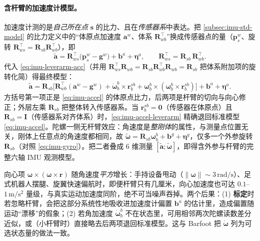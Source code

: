 \paragraph{含杆臂的加速度计模型。}
加速度计测的是\emph{自己所在点} $\mathbf s$ 的比力、且在\emph{传感器系}中表达。把 \cref{subsec:imu-std-model} 的比力定义中的“体原点加速度 $\mathbf a^w$、体系 $\mathbf R_{wb}^\top$”换成传感器点的量（$\ddot{\mathbf p}_s^w$、旋转 $\mathbf R_{ws}^\top=\mathbf R_{sb}\mathbf R_{wb}^\top$），即
\begin{equation}
  \tilde{\mathbf a}=\mathbf R_{ws}^\top\big(\ddot{\mathbf p}_s^w-\mathbf g^w\big)+\mathbf b^a+\boldsymbol\eta^a,
  \qquad \mathbf R_{ws}^\top=\mathbf R_{sb}\,\mathbf R_{wb}^\top.
  \label{eq:imu-accel-leverarm-raw}
\end{equation}
代入 \cref{eq:imu-leverarm-acc}（并用 $\mathbf R_{ws}^\top\mathbf R_{wb}=\mathbf R_{sb}\mathbf R_{wb}^\top\mathbf R_{wb}=\mathbf R_{sb}$ 把体系附加项的旋转化简）得最终模型：
\begin{equation}
  \tilde{\mathbf a}=\mathbf R_{sb}\Big[\mathbf R_{wb}^\top(\mathbf a^w-\mathbf g^w)
  +\dot{\boldsymbol\omega}_b^b\times\mathbf r_b^{sb}
  +\boldsymbol\omega_b^b\times(\boldsymbol\omega_b^b\times\mathbf r_b^{sb})\Big]+\mathbf b^a+\boldsymbol\eta^a.
  \label{eq:imu-accel-leverarm}
\end{equation}
方括号第一项正是 \cref{eq:imu-accel} 的体原点比力，后两项是杆臂的切向与向心修正；外层左乘 $\mathbf R_{sb}$ 把整体转入传感器系。当 $\mathbf r_b^{sb}=\mathbf 0$（传感器在体原点）且 $\mathbf R_{sb}=\mathbf I$（传感器系对齐体系）时，\cref{eq:imu-accel-leverarm} 精确退回标准模型 \cref{eq:imu-accel}。陀螺一侧无杆臂效应：角速度是\emph{整刚体}的属性，与测量点位置无关，刚体上任意点的角速度都相同，故 $\tilde{\boldsymbol\omega}=\mathbf R_{sb}\boldsymbol\omega_b^b+\mathbf b^g+\boldsymbol\eta^g$，仅多一个外参旋转 $\mathbf R_{sb}$（对照 \cref{eq:imu-gyro}）。把二者叠成 $6$ 维测量 $[\tilde{\mathbf a};\tilde{\boldsymbol\omega}]$，即得含外参与杆臂的完整六轴 IMU 观测模型。

\begin{insight}\label{ins:imu-leverarm}
向心项 $\boldsymbol\omega\times(\boldsymbol\omega\times\mathbf r)$ 随角速度\emph{平方}增长：手持设备甩动（$\|\boldsymbol\omega\|\sim3\,\mathrm{rad/s}$）、足式机器人摆腿、旋翼快速偏航时，即便杆臂只有几厘米，向心加速度也可达 $0.1$--$1\,\mathrm{m/s^2}$ 量级，与真实运动加速度同阶，绝不可当噪声吞掉。两个后果：(1) \textbf{标定}时若忽略杆臂，会把这部分系统性地吸收进加速度计偏置 $\mathbf b^a$ 的估计里，造成偏置随运动“漂移”的假象；(2) 若角加速度 $\dot{\boldsymbol\omega}_b^b$ 不在状态里，可用相邻两次陀螺读数差分近似，或（小杆臂时）直接略去后两项退回标准模型。这与 Barfoot 把 $\dot{\boldsymbol\omega}$ 列为可选状态量的做法一致\cite{barfoot2024state}。
\end{insight}

